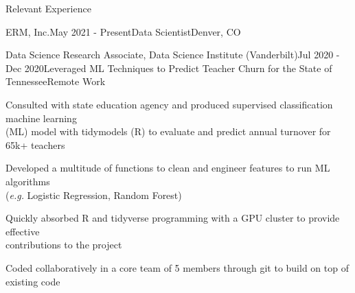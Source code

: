 \documentclass{resume} %
\newcommand{\commentblock}[1]{}
\begin{document}
\begin{rSection}{Relevant Experience}
\begin{rSubsection}{ERM, Inc.}{May 2021 - Present}{Data Scientist}{Denver, CO}
    \vspace{-0.5em}
    \vspace{-0.5em}
    \vspace{-0.5em}
    \vspace{0.25em}

\commentblock{
    \item {Constructed Custom GIS Tool to Quantify Forest Quality Around the Globe: Used python and ArcGIS to create ArcPro toolbox}
        \vspace{-0.5em}
        \subitem{$\cdot$ Utilized the pythonic arcpy module to generate a custom tool that allows the user to acquire forest quality around the globe}
        \vspace{-0.5em}
        \subitem {$\cdot$ Leveraged pythonic methods to create tool with simple interface for user and readable reports}
        \vspace{0.25em}
    \item {Selected to lead the changes for advanced computational infrastructure for N. American \\ Data Science teams}
}
\end{rSubsection} 


\begin{rSubsection}{Data Science Research Associate, Data Science Institute (Vanderbilt)}{Jul 2020 - Dec 2020}{Leveraged ML Techniques to Predict Teacher Churn for the State of Tennessee}{Remote Work} 
\item {Consulted with state education agency and produced supervised classification machine learning \\ (ML) model with tidymodels (R) to evaluate and predict annual turnover for 65k+ teachers}
\item {Developed a multitude of functions to clean and engineer features to run ML algorithms \\ (\emph{e.g.} Logistic Regression, Random Forest)}
\item {Quickly absorbed R and tidyverse programming with a GPU cluster to provide effective \\ contributions to the project}
\item {Coded collaboratively in a core team of 5 members through git to build on top of existing code}


\end{rSubsection}
\end{rSection}
\end{document}

